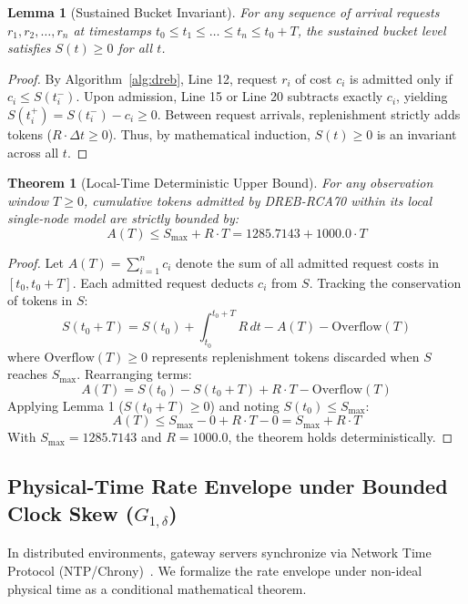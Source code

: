 \documentclass[conference]{IEEEtran}
\newtheorem{theorem}{Theorem}
\newtheorem{lemma}{Lemma}
\begin{document}
\begin{lemma}[Sustained Bucket Invariant]
For any sequence of arrival requests $r_1, r_2, \dots, r_n$ at timestamps $t_0 \le t_1 \le \dots \le t_n \le t_0 + T$, the sustained bucket level satisfies $S(t) \ge 0$ for all $t$.
\end{lemma}

\begin{proof}
By Algorithm~\ref{alg:dreb}, Line 12, request $r_i$ of cost $c_i$ is admitted only if $c_i \le S(t_i^-)$. Upon admission, Line 15 or Line 20 subtracts exactly $c_i$, yielding $S(t_i^+) = S(t_i^-) - c_i \ge 0$. Between request arrivals, replenishment strictly adds tokens ($R \cdot \Delta t \ge 0$). Thus, by mathematical induction, $S(t) \ge 0$ is an invariant across all $t$.
\end{proof}

\begin{theorem}[Local-Time Deterministic Upper Bound]
For any observation window $T \ge 0$, cumulative tokens admitted by DREB-RCA70 within its local single-node model are strictly bounded by:
\begin{equation}
A(T) \le S_{\max} + R \cdot T = 1285.7143 + 1000.0 \cdot T
\end{equation}
\end{theorem}

\begin{proof}
Let $A(T) = \sum_{i=1}^n c_i$ denote the sum of all admitted request costs in $[t_0, t_0 + T]$. Each admitted request deducts $c_i$ from $S$. Tracking the conservation of tokens in $S$:
$$S(t_0 + T) = S(t_0) + \int_{t_0}^{t_0+T} R\,dt - A(T) - \text{Overflow}(T)$$
where $\text{Overflow}(T) \ge 0$ represents replenishment tokens discarded when $S$ reaches $S_{\max}$. Rearranging terms:
$$A(T) = S(t_0) - S(t_0 + T) + R \cdot T - \text{Overflow}(T)$$
Applying Lemma 1 ($S(t_0 + T) \ge 0$) and noting $S(t_0) \le S_{\max}$:
$$A(T) \le S_{\max} - 0 + R \cdot T - 0 = S_{\max} + R \cdot T$$
With $S_{\max} = 1285.7143$ and $R = 1000.0$, the theorem holds deterministically.
\end{proof}

\subsection{Physical-Time Rate Envelope under Bounded Clock Skew ($G_{1,\delta}$)}
In distributed environments, gateway servers synchronize via Network Time Protocol (NTP/Chrony)~\cite{mills1991internet}. We formalize the rate envelope under non-ideal physical time as a conditional mathematical theorem.
\end{document}
